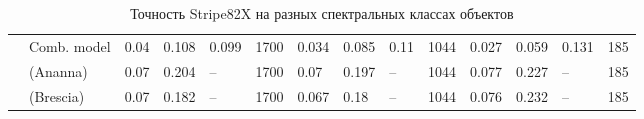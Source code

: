 \documentclass[fleqn,usenatbib]{mnras}
\begin{document}
\begin{table}
\begin{tabular}{lllllrlllrlllr}
                & Comb. model &               0.04 &           0.108 &            0.099 &        1700 &              0.034 &           0.085 &             0.11 &        1044 &              0.027 &           0.059 &            0.131 &         185 \\
                & (Ananna) &               0.07 &           0.204 &           -- &        1700 &               0.07 &           0.197 &           -- &        1044 &              0.077 &           0.227 &           -- &         185 \\
                & (Brescia) &               0.07 &           0.182 &           -- &        1700 &              0.067 &            0.18 &           -- &        1044 &              0.076 &           0.232 &           -- &         185 \\
            \hline
            \end{tabular}
            \caption{Точность Stripe82X на разных спектральных классах объектов}\label{tab:stripe82x-spec-class}
\end{table}
\end{document}
